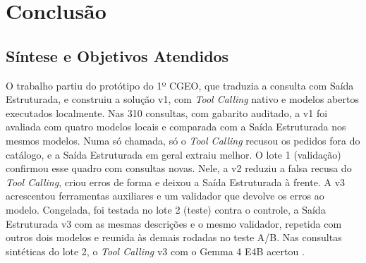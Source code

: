 \chapter{Conclusão}
\label{cap:conclusao}

\section{Síntese e Objetivos Atendidos}

O trabalho partiu do protótipo do 1º CGEO, que traduzia a consulta com Saída Estruturada, e construiu a solução v1, com \textit{Tool Calling} nativo e modelos abertos executados localmente. Nas 310 consultas, com gabarito auditado, a v1 foi avaliada com quatro modelos locais e comparada com a Saída Estruturada nos mesmos modelos. Numa só chamada, só o \textit{Tool Calling} recusou os pedidos fora do catálogo, e a Saída Estruturada em geral extraiu melhor. O lote 1 (validação) confirmou esse quadro com consultas novas. Nele, a v2 reduziu a falsa recusa do \textit{Tool Calling}, criou erros de forma e deixou a Saída Estruturada à frente. A v3 acrescentou ferramentas auxiliares e um validador que devolve os erros ao modelo. Congelada, foi testada no lote 2 (teste) contra o controle, a Saída Estruturada v3 com as mesmas descrições e o mesmo validador, repetida com outros dois modelos e reunida às demais rodadas no teste A/B. Nas consultas sintéticas do lote 2, o \textit{Tool Calling} v3 com o Gemma 4 E4B acertou .

